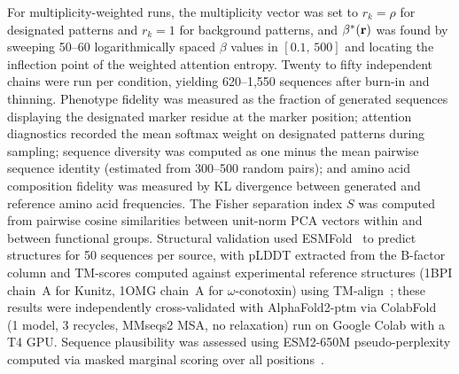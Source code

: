 For multiplicity-weighted runs, the multiplicity vector was set to $r_k = \rho$ for designated
patterns and $r_k = 1$ for background patterns, and $\beta^{*}(\mathbf{r})$ was found by sweeping
50--60 logarithmically spaced $\beta$ values in $[0.1,\, 500]$ and locating the inflection
point of the weighted attention entropy. Twenty to fifty independent chains were run per
condition, yielding 620--1{,}550 sequences after burn-in and thinning. Phenotype fidelity was
measured as the fraction of generated sequences displaying the designated marker residue at the
marker position; attention diagnostics recorded the mean softmax weight on designated patterns
during sampling; sequence diversity was computed as one minus the mean pairwise sequence identity
(estimated from 300--500 random pairs); and amino acid composition fidelity was measured by KL
divergence between generated and reference amino acid frequencies. The Fisher separation
index $S$ was computed from pairwise cosine similarities between unit-norm PCA vectors within
and between functional groups. Structural validation used
ESMFold~\cite{esmfold2022} to predict structures for 50 sequences per source, with pLDDT
extracted from the B-factor column and TM-scores computed against experimental reference
structures (1BPI chain~A for Kunitz, 1OMG chain~A for $\omega$-conotoxin) using
TM-align~\cite{tmAlign2005}; these results were independently cross-validated with AlphaFold2-ptm via
ColabFold~\cite{jumperHighlyAccurate2021,mirdita2022colabfold} (1 model, 3 recycles,
MMseqs2 MSA, no relaxation) run on Google Colab with a T4 GPU. Sequence plausibility was assessed using ESM2-650M
pseudo-perplexity computed via masked marginal scoring over all
positions~\cite{esmfold2022}.

